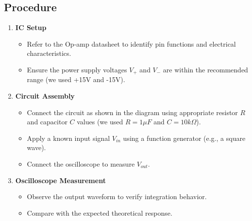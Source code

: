 \documentclass[a4paper,12pt]{article}
\begin{document}
\subsection{Procedure}
\begin{enumerate}
    \item \textbf{IC Setup}
    \begin{itemize}
        \item Refer to the Op-amp datasheet to identify pin functions and electrical characteristics.
        \item Ensure the power supply voltages \( V_+ \) and \( V_- \) are within the recommended range (we used +15V and -15V).
    \end{itemize}
    \item \textbf{Circuit Assembly}
    \begin{itemize}
	    \item Connect the circuit as shown in the diagram using appropriate resistor \( R \) and capacitor \( C \) values (we used $R=1\mu F$ and $C=10k\Omega$).
        \item Apply a known input signal \( V_{in} \) using a function generator (e.g., a square wave).
        \item Connect the oscilloscope to measure \( V_{out} \).
    \end{itemize}
    \item \textbf{Oscilloscope Measurement}
    \begin{itemize}
        \item Observe the output waveform to verify integration behavior.
        \item Compare with the expected theoretical response.
    \end{itemize}
\end{enumerate}
\end{document}
